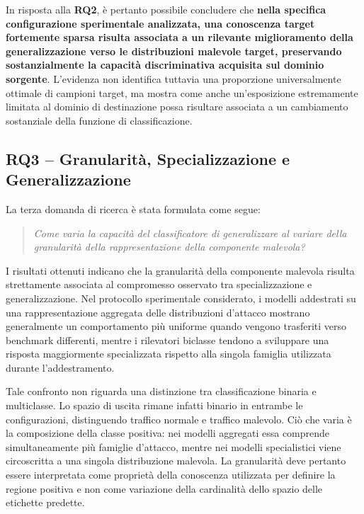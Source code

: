 In risposta alla \textbf{RQ2}, è pertanto possibile concludere che \textbf{nella specifica configurazione sperimentale analizzata, una conoscenza target fortemente sparsa risulta associata a un rilevante miglioramento della generalizzazione verso le distribuzioni malevole target, preservando sostanzialmente la capacità discriminativa acquisita sul dominio sorgente}.
L'evidenza non identifica tuttavia una proporzione universalmente ottimale di campioni target, ma mostra come anche un'esposizione estremamente limitata al dominio di destinazione possa risultare associata a un cambiamento sostanziale della funzione di classificazione.



\subsection{RQ3 -- Granularità, Specializzazione e Generalizzazione}
\label{subsec:conclusioni_rq3}

La terza domanda di ricerca è stata formulata come segue:

\begin{quote}
\textit{Come varia la capacità del classificatore di generalizzare al variare della granularità della rappresentazione della componente malevola?}
\end{quote}

I risultati ottenuti indicano che la granularità della componente malevola risulta strettamente associata al compromesso osservato tra specializzazione e generalizzazione.
Nel protocollo sperimentale considerato, i modelli addestrati su una rappresentazione aggregata delle distribuzioni d'attacco mostrano generalmente un comportamento più uniforme quando vengono trasferiti verso benchmark differenti, mentre i rilevatori biclasse tendono a sviluppare una risposta maggiormente specializzata rispetto alla singola famiglia utilizzata durante l'addestramento.

Tale confronto non riguarda una distinzione tra classificazione binaria e multiclasse.
Lo spazio di uscita rimane infatti binario in entrambe le configurazioni, distinguendo traffico normale e traffico malevolo.
Ciò che varia è la composizione della classe positiva: nei modelli aggregati essa comprende simultaneamente più famiglie d'attacco, mentre nei modelli specialistici viene circoscritta a una singola distribuzione malevola.
La granularità deve pertanto essere interpretata come proprietà della conoscenza utilizzata per definire la regione positiva e non come variazione della cardinalità dello spazio delle etichette predette.


